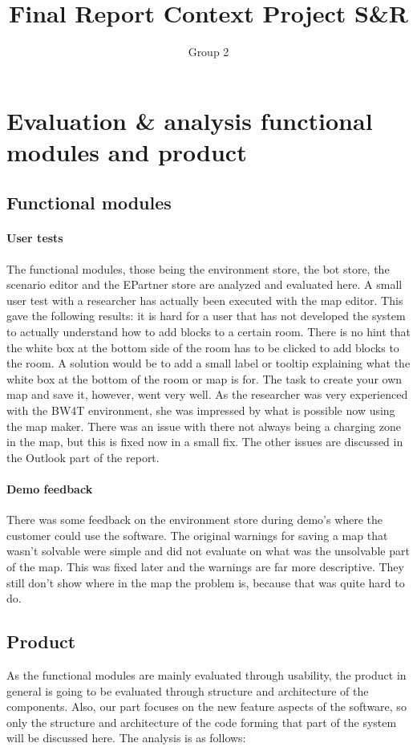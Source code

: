 \documentclass[]{article}
\title{Final Report Context Project S\&R}
\author{Group 2}
\begin{document}
\maketitle
\section{Evaluation \& analysis functional modules and product}
\subsection{Functional modules}
\paragraph{User tests}
The functional modules, those being the environment store, the bot store, the scenario editor and the EPartner store are analyzed and evaluated here. A small user test with a researcher has actually been executed with the map editor. This gave the following results: it is hard for a user that has not developed the system to actually understand how to add blocks to a certain room. There is no hint that the white box at the bottom side of the room has to be clicked to add blocks to the room. A solution would be to add a small label or tooltip explaining what the white box at the bottom of the room or map is for. The task to create your own map and save it, however, went very well. As the researcher was very experienced with the BW4T environment, she was impressed by what is possible now using the map maker. There was an issue with there not always being a charging zone in the map, but this is fixed now in a small fix. The other issues are discussed in the Outlook part of the report.
\paragraph{Demo feedback}
There was some feedback on the environment store during demo's where the customer could use the software. The original warnings for saving a map that wasn't solvable were simple and did not evaluate on what was the unsolvable part of the map. This was fixed later and the warnings are far more descriptive. They still don't show where in the map the problem is, because that was quite hard to do.
\subsection{Product}
As the functional modules are mainly evaluated through usability, the product in general is going to be evaluated through structure and architecture of the components. Also, our part focuses on the new feature aspects of the software, so only the structure and architecture of the code forming that part of the system will be discussed here. The analysis is as follows:
\end{document}

